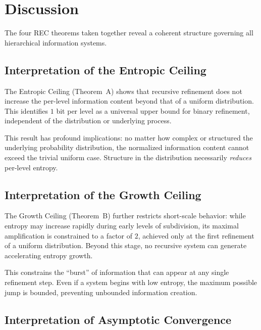 \documentclass[11pt,a4paper]{article}
\theoremstyle{definition}
\theoremstyle{remark}
\begin{document}
\section{Discussion}
\label{sec:discussion}

The four REC theorems taken together reveal a coherent structure governing
all hierarchical information systems. 

\subsection{Interpretation of the Entropic Ceiling}

The Entropic Ceiling (Theorem~A)
shows that recursive refinement does not increase the per-level information
content beyond that of a uniform distribution. This identifies $1$ bit per 
level as a universal upper bound for binary refinement, independent of the 
distribution or underlying process.

This result has profound implications: no matter how complex or structured
the underlying probability distribution, the normalized information content
cannot exceed the trivial uniform case. Structure in the distribution 
necessarily \emph{reduces} per-level entropy.

\subsection{Interpretation of the Growth Ceiling}

The Growth Ceiling (Theorem~B) further restricts short-scale behavior: while
entropy may increase rapidly during early levels of subdivision, its maximal
amplification is constrained to a factor of $2$, achieved only at the first 
refinement of a uniform distribution. Beyond this stage, no recursive system 
can generate accelerating entropy growth.

This constrains the ``burst'' of information that can appear at any single
refinement step. Even if a system begins with low entropy, the maximum 
possible jump is bounded, preventing unbounded information creation.

\subsection{Interpretation of Asymptotic Convergence}
\end{document}
